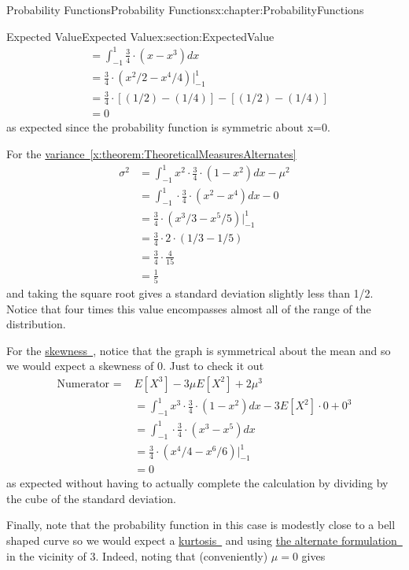 \documentclass[oneside,10pt,]{book}
\newcommand{\xreffont}{\relax}
\numberwithin{equation}{section}
\begin{document}
\begin{chapterptx}{Probability Functions}{}{Probability Functions}{}{}{x:chapter:ProbabilityFunctions}
\begin{sectionptx}{Expected Value}{}{Expected Value}{}{}{x:section:ExpectedValue}
\begin{align*}
& = \int_{-1}^1 \frac{3}{4} \cdot (x-x^3) dx\\
& = \frac{3}{4} \cdot (x^2/2-x^4/4) \big |_{-1}^1\\
& = \frac{3}{4} \cdot [(1/2)-(1/4)] - [(1/2) - (1/4)]\\
& = 0
\end{align*}
as expected since the probability function is symmetric about x=0.%
\par
For the \hyperref[x:theorem:TheoreticalMeasuresAlternates]{variance~{\xreffont\ref{x:theorem:TheoreticalMeasuresAlternates}}}%
\begin{align*}
\sigma^2 & = \int_{-1}^1 x^2 \cdot \frac{3}{4} \cdot (1-x^2) dx - \mu^2\\
& = \int_{-1}^1 \cdot \frac{3}{4} \cdot (x^2-x^4) dx - 0\\
& = \frac{3}{4} \cdot (x^3 /3 -x^5 / 5) \big |_{-1}^1\\
& = \frac{3}{4} \cdot 2 \cdot (1/3-1/5)\\
& = \frac{3}{4} \cdot \frac{4}{15}\\
& = \frac{1}{5}
\end{align*}
and taking the square root gives a standard deviation slightly less than 1\slash{}2. Notice that four times this value encompasses almost all of the range of the distribution.%
\par
For the \hyperlink{x:li:TheoreticalSkewness}{skewness~{\xreffont 3}}, notice that the graph is symmetrical about the mean and so we would expect a skewness of 0.  Just to check it out%
\begin{align*}
\text{Numerator = } & E[X^3] - 3 \mu E[X^2] + 2\mu^3\\
& = \int_{-1}^1 x^3 \cdot \frac{3}{4} \cdot (1-x^2) dx - 3 E[X^2] \cdot 0 + 0^3 \\
& = \int_{-1}^1 \cdot \frac{3}{4} \cdot (x^3-x^5) dx\\
& = \frac{3}{4} \cdot (x^4/4-x^6/6) \big |_{-1}^1\\
& = 0
\end{align*}
as expected without having to actually complete the calculation by dividing by the cube of the standard deviation.%
\par
Finally, note that the probability function in this case is modestly close to a bell shaped curve so we would expect a \hyperlink{x:li:TheoreticalKurtosis}{kurtosis~{\xreffont 4}} and using \hyperlink{x:li:TheoreticalKurtosis}{the alternate formulation~{\xreffont 4}} in the vicinity of 3. Indeed, noting that (conveniently) \(\mu = 0\) gives%
\begin{align*}

\end{align*}
\end{sectionptx}
\end{chapterptx}
\end{document}
